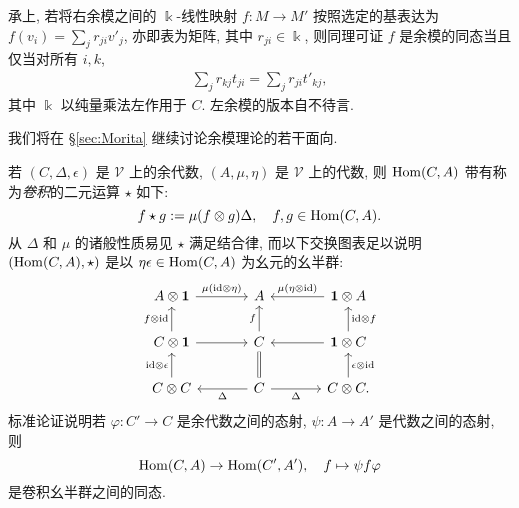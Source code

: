 承上, 若将右余模之间的 $\Bbbk$-线性映射 $f: M \to M'$ 按照选定的基表达为 $f(v_i) = \sum_j r_{ji} v'_j$, 亦即表为矩阵, 其中 $r_{ji} \in \Bbbk$, 则同理可证 $f$ 是余模的同态当且仅当对所有 $i, k$,
\begin{equation*}\begin{gathered}
	\sum_j r_{kj} t_{ji} = \sum_j r_{ji} t'_{kj},
\end{gathered}\end{equation*}
其中 $\Bbbk$ 以纯量乘法左作用于 $C$. 左余模的版本自不待言.

我们将在 \S\ref{sec:Morita} 继续讨论余模理论的若干面向.

\begin{remark}\label{rem:coalgebra-convolution}
	若 $(C, \Delta, \epsilon)$ 是 $\mathcal{V}$ 上的余代数, $(A, \mu, \eta)$ 是 $\mathcal{V}$ 上的代数, 则 $\operatorname{Hom}(C, A)$ 带有称为\emph{卷积}的二元运算 $\star$ 如下:
	\[ f \star g := \mu (f \otimes g) \Delta, \quad f, g \in \operatorname{Hom}(C, A). \]
	从 $\Delta$ 和 $\mu$ 的诸般性质易见 $\star$ 满足结合律, 而以下交换图表足以说明 $(\operatorname{Hom}(C, A), \star)$ 是以 $\eta\epsilon \in \operatorname{Hom}(C, A)$ 为幺元的幺半群:
	\[\begin{tikzcd}[column sep=large]
		A \otimes \munit \arrow[r, "{\mu(\identity \otimes \eta)}"] & A & \munit \otimes A \arrow[l, "{\mu(\eta \otimes \identity)}"'] \\
		C \otimes \munit \arrow[r] \arrow[u, "{f \otimes \identity}"] & C \arrow[u, "f"] & \munit \otimes C \arrow[l] \arrow[u, "{\identity \otimes f}"'] \\
		C \otimes C \arrow[u, "{\identity \otimes \epsilon}"] & C \arrow[l, "\Delta"] \arrow[r, "\Delta"'] \arrow[equal, u] & C \otimes C . \arrow[u, "{\epsilon \otimes \identity}"']
	\end{tikzcd}\]
	标准论证说明若 $\varphi: C' \to C$ 是余代数之间的态射, $\psi: A \to A'$ 是代数之间的态射, 则
	\begin{equation}\label{eqn:convolution-functorial}
		\operatorname{Hom}(C, A) \to \operatorname{Hom}(C', A'), \quad f \mapsto \psi f \varphi
	\end{equation}
	是卷积幺半群之间的同态.
\end{remark}

